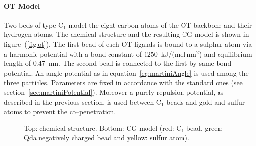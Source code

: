 \paragraph{\textbf{OT Model}} Two \martini beds of type C$_1$ model the eight carbon atoms of the \ac{OT} backbone and their hydrogen atoms. The chemical structure and the resulting \ac{CG} \martini model is shown in figure~(\ref{fig:ot}). The first bead of each \ac{OT} ligands is bound to a sulphur atom via a harmonic potential with a bond constant of $1250$~kJ/(mol\,nm$^2$) and equilibrium length of $0.47$~nm. The second bead is connected to the first by same bond potential. An angle potential as in equation~\eqref{eq:martiniAngle} is used among the three particles. Parameters are fixed in accordance with the standard \martini ones (see section~\ref{sec:martiniPotential}). Moreover a purely repulsion potential, as described in the previous section, is used between C$_1$ beads and gold and sulfur atoms to prevent the co--penetration.
\begin{figure}[!ht]
	\centering
	\qquad\qquad%
	\caption{Top: chemical structure. Bottom: \acs{CG} \martini model (red: C$_1$ bead, green: Qda negatively charged bead and yellow: sulfur atom).}
\end{figure}

